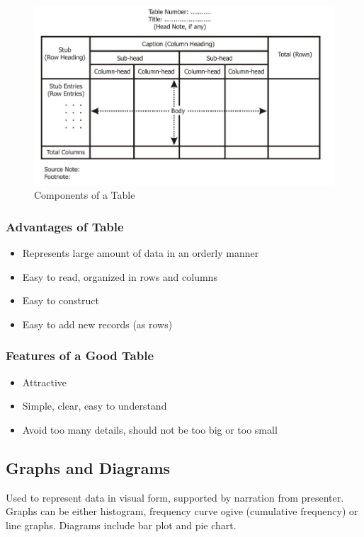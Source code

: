 \documentclass{article}
\begin{document}
\begin{figure}[htp]
    \centering
    \includegraphics[width=0.8 \linewidth]{img/table.png}
    \caption{Components of a Table}
    \label{fig:tail-test}
\end{figure}

\subsubsection{Advantages of Table}

\begin{itemize}
    \item Represents large amount of data in an orderly manner
    \item Easy to read, organized in rows and columns
    \item Easy to construct
    \item Easy to add new records (as rows)
\end{itemize}

\subsubsection{Features of a Good Table}
\begin{itemize}
    \item Attractive
    \item Simple, clear, easy to understand
    \item Avoid too many details, should not be too big or too small
\end{itemize}

\subsection{Graphs and Diagrams}

Used to represent data in visual form, supported by narration from presenter. Graphs can be either histogram, frequency curve ogive (cumulative frequency) or line graphs. Diagrams include bar plot and pie chart.
\end{document}
